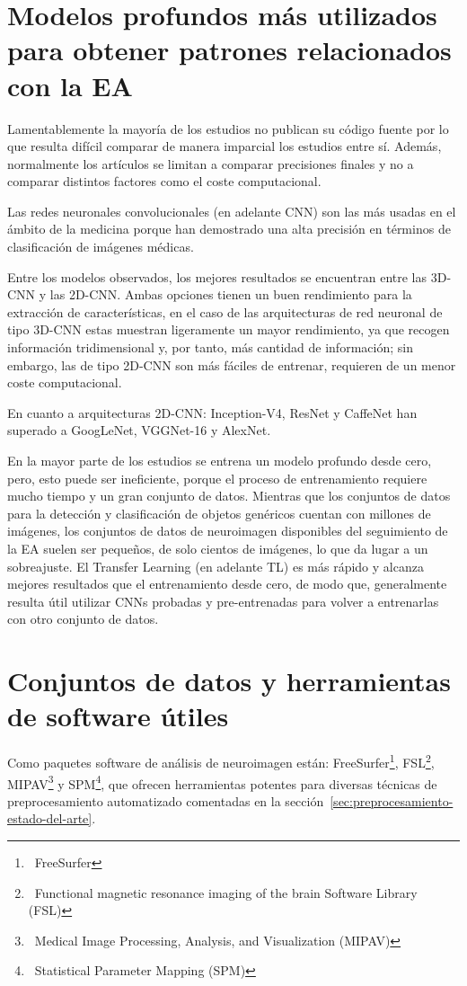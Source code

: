 \section{Modelos profundos más utilizados para obtener patrones relacionados con la EA}
\label{sec:modelos-profundos-estado-del-arte}
Lamentablemente la mayoría de los estudios no publican su código fuente por lo que resulta difícil comparar de manera
imparcial los estudios entre sí.
Además, normalmente los artículos se limitan a comparar precisiones finales y no a comparar distintos factores como el
coste computacional.

Las redes neuronales convolucionales (en adelante \Gls{CNN}) son las más usadas en el ámbito de la medicina porque han
demostrado una alta precisión en términos de clasificación de imágenes médicas.

Entre los modelos observados, los mejores resultados se encuentran entre las 3D-CNN y las 2D-CNN. Ambas opciones tienen
un buen rendimiento para la extracción de características, en el caso de las arquitecturas de red neuronal de tipo
3D-CNN estas muestran ligeramente un mayor rendimiento, ya que recogen información tridimensional y, por tanto, más
cantidad de información;
sin embargo, las de tipo 2D-CNN son más fáciles de entrenar, requieren de un menor coste computacional.

En cuanto a arquitecturas 2D-CNN: Inception-V4, ResNet y CaffeNet han superado a GoogLeNet, VGGNet-16 y AlexNet.

En la mayor parte de los estudios se entrena un modelo profundo desde cero, pero, esto puede ser ineficiente, porque
el proceso de entrenamiento requiere mucho tiempo y un gran conjunto de datos.
Mientras que los conjuntos de datos para la detección y clasificación de objetos genéricos cuentan con millones de
imágenes, los conjuntos de datos de neuroimagen disponibles del seguimiento de la EA suelen ser pequeños, de solo
cientos de imágenes, lo que da lugar a un sobreajuste.
El Transfer Learning (en adelante \Gls{TL}) es más rápido y alcanza mejores resultados que el entrenamiento desde cero, de
modo que, generalmente resulta útil utilizar CNNs probadas y pre-entrenadas para volver a entrenarlas con otro conjunto
de datos.

\section{Conjuntos de datos y herramientas de software útiles}\label{sec:datos-y-herramientas-estado-del-arte}
Como paquetes software de análisis de neuroimagen están:
FreeSurfer\footnote{~\cite{freeSurfer}{FreeSurfer}},
FSL\footnote{~\cite{fsl}{Functional magnetic resonance imaging of the brain Software Library (FSL)}},
MIPAV\footnote{~\cite{mipav}{Medical Image Processing, Analysis, and Visualization (MIPAV)}}
y SPM\footnote{~\cite{spm}{Statistical Parameter Mapping (SPM)}},
que ofrecen herramientas potentes para diversas técnicas de preprocesamiento automatizado comentadas en la
sección~\ref{sec:preprocesamiento-estado-del-arte}.

